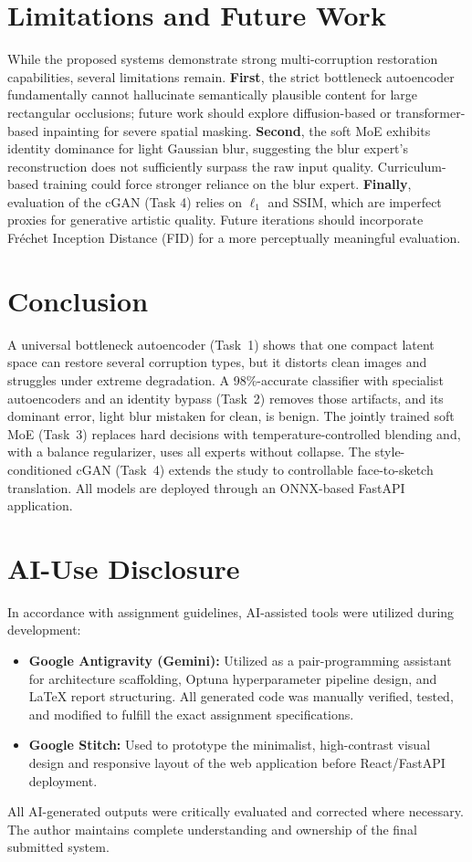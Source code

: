 \documentclass[conference]{IEEEtran}
\begin{document}
\section{Limitations and Future Work}
While the proposed systems demonstrate strong multi-corruption restoration capabilities, several limitations remain. \textbf{First}, the strict bottleneck autoencoder fundamentally cannot hallucinate semantically plausible content for large rectangular occlusions; future work should explore diffusion-based or transformer-based inpainting for severe spatial masking. \textbf{Second}, the soft MoE exhibits identity dominance for light Gaussian blur, suggesting the blur expert's reconstruction does not sufficiently surpass the raw input quality. Curriculum-based training could force stronger reliance on the blur expert. \textbf{Finally}, evaluation of the cGAN (Task 4) relies on $\ell_1$ and SSIM, which are imperfect proxies for generative artistic quality. Future iterations should incorporate Fréchet Inception Distance (FID) for a more perceptually meaningful evaluation.

\section{Conclusion}
A universal bottleneck autoencoder (Task~1) shows that one compact latent space can restore several corruption types, but it distorts clean images and struggles under extreme degradation. A 98\%-accurate classifier with specialist autoencoders and an identity bypass (Task~2) removes those artifacts, and its dominant error, light blur mistaken for clean, is benign. The jointly trained soft MoE (Task~3) replaces hard decisions with temperature-controlled blending and, with a balance regularizer, uses all experts without collapse. The style-conditioned cGAN (Task~4) extends the study to controllable face-to-sketch translation. All models are deployed through an ONNX-based FastAPI application.

\appendices
\section{AI-Use Disclosure}
In accordance with assignment guidelines, AI-assisted tools were utilized during development:
\begin{itemize}
    \item \textbf{Google Antigravity (Gemini):} Utilized as a pair-programming assistant for architecture scaffolding, Optuna hyperparameter pipeline design, and LaTeX report structuring. All generated code was manually verified, tested, and modified to fulfill the exact assignment specifications.
    \item \textbf{Google Stitch:} Used to prototype the minimalist, high-contrast visual design and responsive layout of the web application before React/FastAPI deployment.
\end{itemize}
All AI-generated outputs were critically evaluated and corrected where necessary. The author maintains complete understanding and ownership of the final submitted system.
\end{document}
